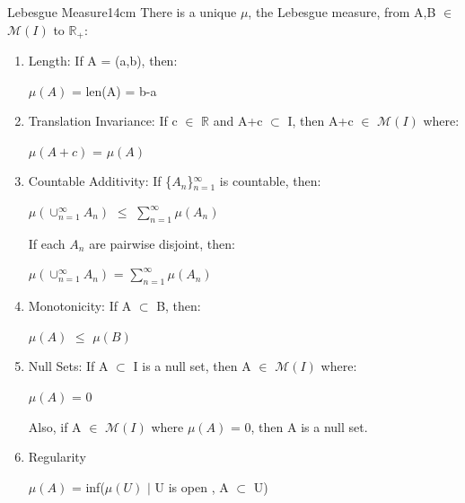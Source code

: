     \vspace{0.5cm}



    \begin{wtheorem}{Lebesgue Measure}{14cm}
        There is a unique $\mu$, the {\color{lblue} Lebesgue measure},
        from A,B $\in$ $\mathcal{M}(I)$ to $\mathbb{R}_+$: 
    \end{wtheorem}

    \begin{enumerate}[label=(\alph*), leftmargin=2cm, itemsep=0.1cm]
        \item {\color{lblue} Length}:
            If A = (a,b), then:

            \hspace{0.5cm}
            $\mu(A)$ = len(A) = b-a

        \item {\color{lblue} Translation Invariance}:
            If c $\in$ $\mathbb{R}$ and A+c $\subset$ I, then
            A+c $\in$ $\mathcal{M}(I)$ where:
            
            \hspace{0.5cm}
            $\mu(A+c)$ = $\mu(A)$

        \item {\color{lblue} Countable Additivity}:
            If \{$A_n$\}$_{n=1}^{\infty}$ is countable, then:

            \hspace{0.5cm}
            $\mu(\cup_{n=1}^{\infty} A_n)$
            $\leq$ $\sum_{n=1}^{\infty} \mu(A_n)$

            If each $A_n$ are pairwise disjoint, then:

            \hspace{0.5cm}
            $\mu(\cup_{n=1}^{\infty} A_n)$
            = $\sum_{n=1}^{\infty} \mu(A_n)$

        \item {\color{lblue} Monotonicity}:
            If A $\subset$ B, then:

            \hspace{0.5cm}
            $\mu(A)$ $\leq$ $\mu(B)$

        \item {\color{lblue} Null Sets}:
            If A $\subset$ I is a null set, then A $\in$ $\mathcal{M}(I)$ where:

            \hspace{0.5cm}
            $\mu(A)$ = 0

            Also, if A $\in$ $\mathcal{M}(I)$ where $\mu(A)$ = 0,
            then A is a null set.

        \item {\color{lblue} Regularity}
        
            \hspace{0.5cm}
            $\mu(A)$ = inf($\mu(U)$ $|$ U is open , A $\subset$ U)
    \end{enumerate}

